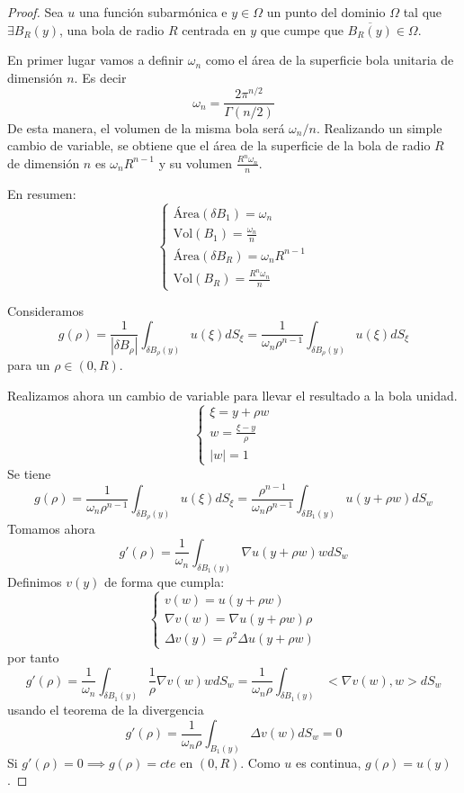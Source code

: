 \begin{proof}
\indent Sea $u$ una función subarmónica e $y\in\Omega$ un punto del dominio $\Omega$ tal que $\exists B_R(y)$, una bola de radio $R$ centrada en $y$ que cumpe que $\overline{B_R(y)}\in\Omega$.
\vspace{5mm}

En primer lugar vamos a definir $\omega_n$ como el área de la superficie bola unitaria de dimensión $n$. Es decir
$$\omega_n = \frac{2\pi^{n/2}}{\Gamma(n/2)}$$ De esta manera, el volumen de la misma bola será $\omega_n/n$.
Realizando un simple cambio de variable, se obtiene que el área de la superficie de la bola de radio $R$ de dimensión $n$ es $\omega_nR^{n-1}$ y su volumen $\frac{R^n\omega_n}{n}$.

En resumen:
\begin{equation*}
\left\{
\begin{array}{l}
\text{Área}(\delta B_1) = \omega_n\\
\text{Vol}(B_1) = \frac{\omega_n}{n}\\
\text{Área}(\delta B_R) = \omega_nR^{n-1}\\
\text{Vol}(B_R) = \frac{R^n\omega_n}{n}
\end{array}
\right.
\end{equation*}

Consideramos
$$g(\rho) = \frac{1}{|\delta B_\rho|}\int_{\delta B_\rho(y)} u(\xi)dS_\xi = \frac{1}{\omega_n \rho^{n-1}}\int_{\delta B_\rho(y)} u(\xi)dS_\xi$$ para un $\rho \in (0,R)$.

Realizamos ahora un cambio de variable para llevar el resultado a la bola unidad.
\begin{equation*}
\left\{
\begin{array}{l}
\xi = y+\rho w\\
w = \frac{\xi-y}{\rho}\\
|w| = 1
\end{array}
\right.
\end{equation*}
Se tiene
$$g(\rho) = \frac{1}{\omega_n \rho^{n-1}}\int_{\delta B_\rho(y)} u(\xi)dS_\xi = \frac{\rho^{n-1}}{\omega_n \rho^{n-1}}\int_{\delta B_1(y)} u(y+\rho w)dS_w$$
Tomamos ahora 
$$g'(\rho) = \frac{1}{\omega_n}\int_{\delta B_1(y)} \nabla u(y+\rho w)wdS_w$$
Definimos $v(y)$ de forma que cumpla:
\begin{equation*}
\left\{
\begin{array}{l}
v(w) = u(y+\rho w)\\
\nabla v(w) = \nabla u(y+\rho w)\rho\\
\Delta v(y) = \rho^2\Delta u(y+\rho w)
\end{array}
\right.
\end{equation*}
por tanto 
$$g'(\rho) =  \frac{1}{\omega_n}\int_{\delta B_1(y)} \frac{1}{\rho} \nabla v(w)wdS_w =  \frac{1}{\omega_n \rho}\int_{\delta B_1(y)} <\nabla v(w), w>dS_w$$
usando el teorema de la divergencia
$$g'(\rho) =  \frac{1}{\omega_n \rho}\int_{B_1(y)} \Delta v(w)dS_w = 0$$
Si $g'(\rho) = 0\implies g(\rho) = cte$ en $(0,R)$. Como $u$ es continua, $g(\rho) = u(y)$.


\end{proof}
